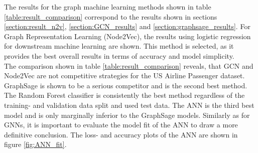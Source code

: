   \begin{table}[h]
    \centering
    \caption{Result Comparison}
    \label{table:result_comparison}
  \end{table}

  \noindent The results for the graph machine learning methods shown in table 
  \ref{table:result_comparison} correspond to the results shown in sections
  \ref{section:result_n2v}, \ref{section:GCN_results} and 
  \ref{section:graphsage_results}. For Graph Representation Learning
  (Node2Vec), the results using logistic regression for downstream machine
  learning are shown. This method is selected, as it provides the best overall 
  results in terms of accuracy and model simplicity. \\

  \noindent The comparison shown in table \ref{table:result_comparison} reveals,
  that GCN and Node2Vec are not competitive strategies for the US Airline 
  Passenger dataset. GraphSage is shown to be a serious competitor and is the
  second best method. The Random Forest classifier is consistently the best 
  method regardless of the training- and validation data split and used test 
  data. The ANN is the third best model and is only marginally inferior to the
  GraphSage models. Similarly as for GNNs, it is important to evaluate the 
  model fit of the ANN to draw a more definitive conclusion. The loss- and
  accuracy plots of the ANN are shown in figure \ref{fig:ANN_fit}.

